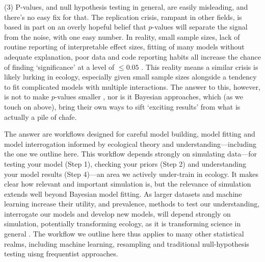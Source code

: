 \documentclass[11pt]{article}
\begin{document}
{(3) P-values, and null hypothesis testing in general, are easily misleading, and there’s no easy fix for that. The replication crisis, rampant in other fields, is based in part on an overly hopeful belief that $p$-values will separate the signal from the noise, with one easy number. In reality, small sample sizes, lack of routine reporting of interpretable effect sizes, fitting of many models without adequate explanation, poor data and code reporting habits all increase the chance of finding `significance' at a level of $\le0.05$ \citep{halsey2015,loken2017}. This reality means a similar crisis is likely lurking in ecology, especially given small sample sizes alongside a tendency to fit complicated models with multiple interactions. The answer to this, however, is not to make $p$-values smaller \citep{halsey2015,colquhoun2017}, nor is it Bayesian approaches, which (as we touch on above), bring their own ways to sift `exciting results' from what is actually a pile of chafe. %

The answer are workflows designed for careful model building, model fitting and model interrogation informed by ecological theory and understanding---including the one we outline here. %
This workflow depends strongly on simulating data---for testing your model (Step 1), checking your priors (Step 2) and understanding your model results (Step 4)---an area we actively under-train in ecology. It makes clear how relevant and important simulation is, but the relevance of simulation extends well beyond Bayesian model fitting. As larger datasets and machine learning increase their utility, and prevalence, methods to test our understanding, interrogate our models and develop new models, will depend strongly on simulation, potentially transforming ecology, as it is transforming science in general \citep{flynn2022digitaltwin,kuntz2022,oren2017}. The workflow we outline here thus applies to many other statistical realms, including machine learning, resampling and traditional null-hypothesis testing uisng frequentist approaches.

}
\end{document}
